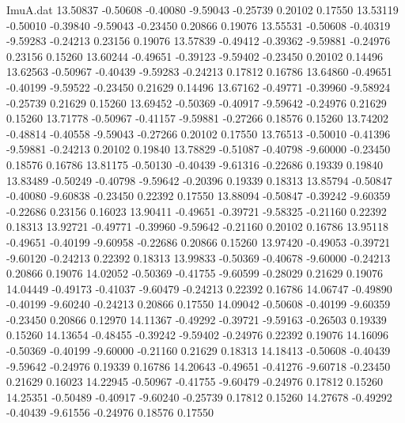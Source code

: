 \begin{filecontents}{ImuA.dat}
  13.50837   -0.50608   -0.40080   -9.59043   -0.25739    0.20102    0.17550
  13.53119   -0.50010   -0.39840   -9.59043   -0.23450    0.20866    0.19076
  13.55531   -0.50608   -0.40319   -9.59283   -0.24213    0.23156    0.19076
  13.57839   -0.49412   -0.39362   -9.59881   -0.24976    0.23156    0.15260
  13.60244   -0.49651   -0.39123   -9.59402   -0.23450    0.20102    0.14496
  13.62563   -0.50967   -0.40439   -9.59283   -0.24213    0.17812    0.16786
  13.64860   -0.49651   -0.40199   -9.59522   -0.23450    0.21629    0.14496
  13.67162   -0.49771   -0.39960   -9.58924   -0.25739    0.21629    0.15260
  13.69452   -0.50369   -0.40917   -9.59642   -0.24976    0.21629    0.15260
  13.71778   -0.50967   -0.41157   -9.59881   -0.27266    0.18576    0.15260
  13.74202   -0.48814   -0.40558   -9.59043   -0.27266    0.20102    0.17550
  13.76513   -0.50010   -0.41396   -9.59881   -0.24213    0.20102    0.19840
  13.78829   -0.51087   -0.40798   -9.60000   -0.23450    0.18576    0.16786
  13.81175   -0.50130   -0.40439   -9.61316   -0.22686    0.19339    0.19840
  13.83489   -0.50249   -0.40798   -9.59642   -0.20396    0.19339    0.18313
  13.85794   -0.50847   -0.40080   -9.60838   -0.23450    0.22392    0.17550
  13.88094   -0.50847   -0.39242   -9.60359   -0.22686    0.23156    0.16023
  13.90411   -0.49651   -0.39721   -9.58325   -0.21160    0.22392    0.18313
  13.92721   -0.49771   -0.39960   -9.59642   -0.21160    0.20102    0.16786
  13.95118   -0.49651   -0.40199   -9.60958   -0.22686    0.20866    0.15260
  13.97420   -0.49053   -0.39721   -9.60120   -0.24213    0.22392    0.18313
  13.99833   -0.50369   -0.40678   -9.60000   -0.24213    0.20866    0.19076
  14.02052   -0.50369   -0.41755   -9.60599   -0.28029    0.21629    0.19076
  14.04449   -0.49173   -0.41037   -9.60479   -0.24213    0.22392    0.16786
  14.06747   -0.49890   -0.40199   -9.60240   -0.24213    0.20866    0.17550
  14.09042   -0.50608   -0.40199   -9.60359   -0.23450    0.20866    0.12970
  14.11367   -0.49292   -0.39721   -9.59163   -0.26503    0.19339    0.15260
  14.13654   -0.48455   -0.39242   -9.59402   -0.24976    0.22392    0.19076
  14.16096   -0.50369   -0.40199   -9.60000   -0.21160    0.21629    0.18313
  14.18413   -0.50608   -0.40439   -9.59642   -0.24976    0.19339    0.16786
  14.20643   -0.49651   -0.41276   -9.60718   -0.23450    0.21629    0.16023
  14.22945   -0.50967   -0.41755   -9.60479   -0.24976    0.17812    0.15260
  14.25351   -0.50489   -0.40917   -9.60240   -0.25739    0.17812    0.15260
  14.27678   -0.49292   -0.40439   -9.61556   -0.24976    0.18576    0.17550

\end{filecontents}
